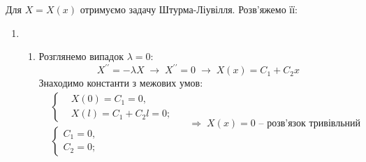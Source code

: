 \documentclass[a4paper, 14pt]{extreport}
\begin{document}
Для $X = X(x)$ отримуємо задачу Штурма-Ліувілля. Розв'яжемо її:
\begin{enumerate}
    \item[] \begin{enumerate}
        \item Розглянемо випадок $\lambda = 0$:
        \begin{equation*}
            X^{\prime\prime} = -\lambda X
            \;\to\;
            X^{\prime\prime} = 0
            \;\to\;
            X(x) = C_1 + C_2 x
        \end{equation*}
        Знаходимо константи з межових умов:
        \begin{equation*}
            \begin{aligned}
                &\left\{ \begin{aligned}
                    &X(0) = C_1 = 0, \\ 
                    &X(l) = C_1 + C_2 l = 0;
                \end{aligned} \right.
                \\   
                &\left\{ \begin{aligned}
                    C_1 = 0, \\ 
                    C_2 = 0;
                \end{aligned} \right.
            \end{aligned}
            \quad\Rightarrow\;
            X(x) = 0 \text{ -- розв'язок тривівльний}
        \end{equation*}
    

\end{enumerate}
\end{enumerate}
\end{document}
